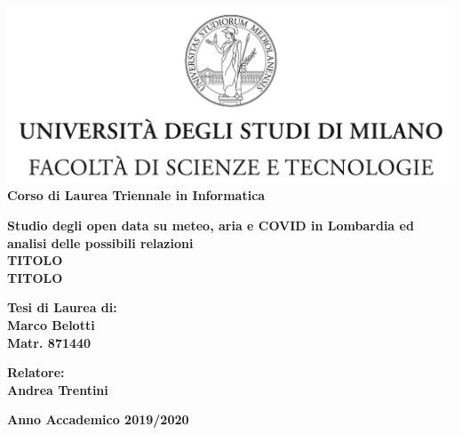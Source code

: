 \documentclass[a4paper,12pt]{report}
\begin{document}
\begin{titlepage}
\begin{center}
\includegraphics[width=\textwidth]{Logo.jpg}\\
{\large{\bf Corso di Laurea Triennale in Informatica}}
\end{center}
\vspace{12mm}
\begin{center}
{\huge{\bf Studio degli open data su meteo, aria e COVID in Lombardia ed analisi delle possibili relazioni}}\\
\vspace{4mm}
{\huge{\bf TITOLO}}\\
\vspace{4mm}
{\huge{\bf TITOLO}}\\
\end{center}
\vspace{12mm}
\begin{flushright}
{\large{\bf Tesi di Laurea di:}}\\
{\large{\bf Marco Belotti}}\\
{\large{\bf Matr. 871440}}\\
\end{flushright}
\vspace{4mm}
\begin{flushleft}
{\large{\bf Relatore:}}\\
{\large{\bf Andrea Trentini}}\\
\vspace{4mm}
\end{flushleft}
\vspace{12mm}
\begin{center}
{\large{\bf Anno Accademico 2019/2020}}
\end{center}
\end{titlepage}

\listoftodos
\end{document}
